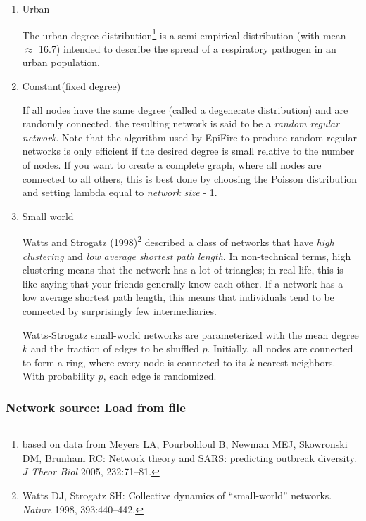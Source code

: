 \documentclass{article}
\begin{document}
\begin{enumerate}
\item Urban

The urban degree distribution\footnote{based on data from Meyers LA, Pourbohloul B, Newman MEJ, Skowronski DM, Brunham RC: Network theory and SARS: predicting outbreak diversity. \textit{J Theor Biol} 2005, 232:71–81.} is a semi-empirical distribution (with mean $\approx$ 16.7) intended to describe the spread of a respiratory pathogen in an urban population.


\vspace{15pt}
\item Constant(fixed degree)

If all nodes have the same degree (called a degenerate distribution) and are randomly connected, the resulting network is said to be a \textit{random regular network}.  Note that the algorithm used by EpiFire to produce random regular networks is only efficient if the desired degree is small relative to the number of nodes.  If you want to create a complete graph, where all nodes are connected to all others, this is best done by choosing the Poisson distribution and setting lambda equal to \textit{network size} - 1.

\vspace{15pt}
\item Small world

Watts and Strogatz (1998)\footnote{Watts DJ, Strogatz SH: Collective dynamics of “small-world” networks. \textit{Nature} 1998, 393:440–442.} described a class of networks that have \textit{high clustering} and \textit{low average shortest path length}.  In non-technical terms, high clustering means that the network has a lot of triangles; in real life, this is like saying that your friends generally know each other.  If a network has a low average shortest path length, this means that individuals tend to be connected by surprisingly few intermediaries.

Watts-Strogatz small-world networks are parameterized with the mean degree $k$ and the fraction of edges to be shuffled $p$.  Initially, all nodes are connected to form a ring, where every node is connected to its $k$ nearest neighbors.  With probability $p$, each edge is randomized.

\end{enumerate}
\subsubsection{Network source: Load from file}
\end{document}
